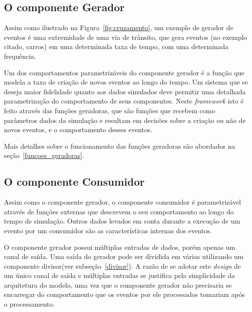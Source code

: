 \subsection{O componente Gerador}

Assim como ilustrado na Figura~\ref{fig:cruzamento}, um exemplo de gerador de eventos é uma extremidade de uma via de trânsito, que gera eventos (no exemplo citado, carros) em uma determinada taxa de tempo, com uma determinada frequência.

Um dos comportamentos parametrizáveis do componente gerador é a função que modela a taxa de criação de novos eventos ao longo do tempo. Um sistema que se deseja maior fidelidade quanto aos dados simulados deve permitir uma detalhada parametrização do comportamento de seus componentes. Neste \textit{framework} isto é feito através das funções geradoras, que são funções que recebem como parâmetros dados da simulação e resultam em decisões sobre a criação ou não de novos eventos, e o comportamento desses eventos.

Mais detalhes sobre o funcionamento das funções geradoras são abordados na seção~\ref{funcoes_geradoras}.

\subsection{O componente Consumidor}

Assim como o componente gerador, o componente consumidor é parametrizável através de funções externas que descrevem o seu comportamento ao longo do tempo de simulação. Outros dados levados em conta durante a execução de um evento por um consumidor são as características internas dos eventos.

O componente gerador possui múltiplas entradas de dados, porém apenas um canal de saída. Uma saída do gerador pode ser dividida em várias utilizando um componente divisor(ver subseção~\ref{divisor}). A razão de se adotar este \textit{design} de um único canal de saída e múltiplas entradas se justifica pela simplicidade da arquitetura do modelo, uma vez que o componente gerador não precisaria se encarregar do comportamento que os eventos por ele processados tomariam após o processamento.

